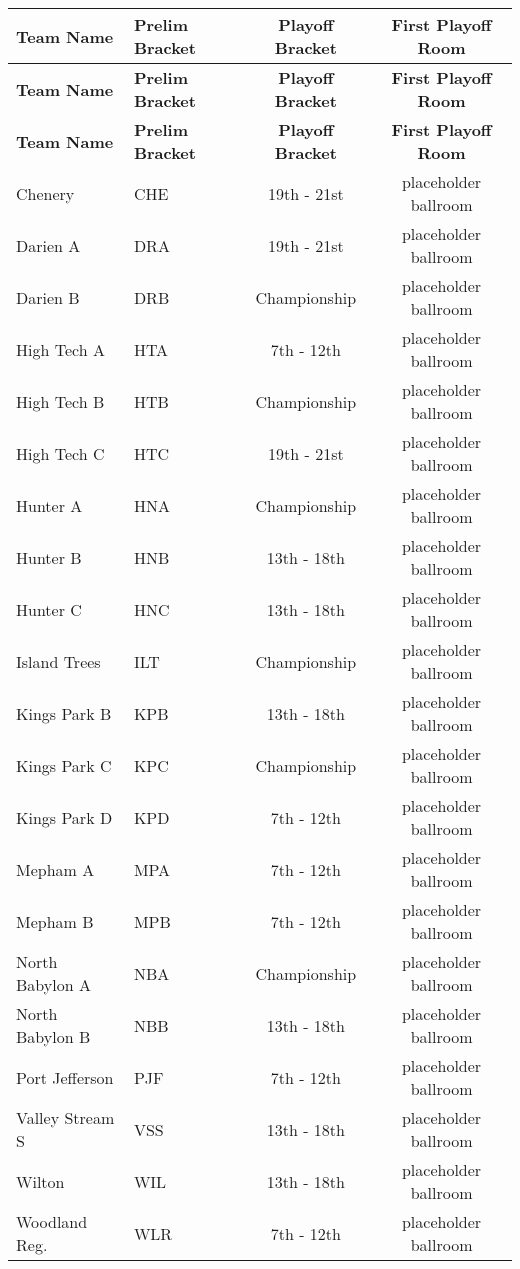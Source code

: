 \documentclass{article}%
\begin{document}
\begin{longtable}{|l|lcc|}%
\rowcolor{gray!30}%
\hline%
\textbf{Team Name} &\textbf{Prelim Bracket}&\textbf{Playoff Bracket}&\textbf{First Playoff Room}\\%
\endhead%
\rowcolor{gray!25}%
\textbf{Team Name} &\textbf{Prelim Bracket}&\textbf{Playoff Bracket}&\textbf{First Playoff Room}\\%
\endfoot%
\hline\rowcolor{gray!25}%
\textbf{Team Name} &\textbf{Prelim Bracket}&\textbf{Playoff Bracket}&\textbf{First Playoff Room}\\%
\endlastfoot%
\hline%
Chenery&CHE&19th {-} 21st&placeholder ballroom\\%
Darien A&DRA&19th {-} 21st&placeholder ballroom\\%
Darien B&DRB&Championship&placeholder ballroom\\%
High Tech A&HTA&7th {-} 12th&placeholder ballroom\\%
High Tech B&HTB&Championship&placeholder ballroom\\%
High Tech C&HTC&19th {-} 21st&placeholder ballroom\\%
Hunter A&HNA&Championship&placeholder ballroom\\%
Hunter B&HNB&13th {-} 18th&placeholder ballroom\\%
Hunter C&HNC&13th {-} 18th&placeholder ballroom\\%
Island Trees&ILT&Championship&placeholder ballroom\\%
Kings Park B&KPB&13th {-} 18th&placeholder ballroom\\%
Kings Park C&KPC&Championship&placeholder ballroom\\%
Kings Park D&KPD&7th {-} 12th&placeholder ballroom\\%
Mepham A&MPA&7th {-} 12th&placeholder ballroom\\%
Mepham B&MPB&7th {-} 12th&placeholder ballroom\\%
North Babylon A&NBA&Championship&placeholder ballroom\\%
North Babylon B&NBB&13th {-} 18th&placeholder ballroom\\%
Port Jefferson&PJF&7th {-} 12th&placeholder ballroom\\%
Valley Stream S&VSS&13th {-} 18th&placeholder ballroom\\%
Wilton&WIL&13th {-} 18th&placeholder ballroom\\%
Woodland Reg.&WLR&7th {-} 12th&placeholder ballroom\\%
\hline%
\end{longtable}%
\end{document}
